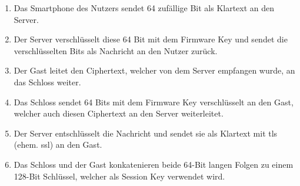        \begin{enumerate}[noitemsep]
            \item Das Smartphone des Nutzers sendet 64 zufällige Bit als Klartext an den Server.
            \item Der Server verschlüsselt diese 64 Bit mit dem Firmware Key und sendet die verschlüsselten Bits als Nachricht an den Nutzer zurück.
            \item Der Gast leitet den Ciphertext, welcher von dem Server empfangen wurde, an das Schloss weiter.
            \item Das Schloss sendet 64 Bits mit dem Firmware Key verschlüsselt an den Gast, welcher auch diesen Ciphertext an den Server weiterleitet.
            \item Der Server entschlüsselt die Nachricht und sendet sie als Klartext mit \gls{tls} (ehem. \gls{ssl}) an den Gast.
            \item Das Schloss und der Gast konkatenieren beide 64-Bit langen Folgen zu einem 128-Bit Schlüssel, welcher als Session Key verwendet wird.
        \end{enumerate}
